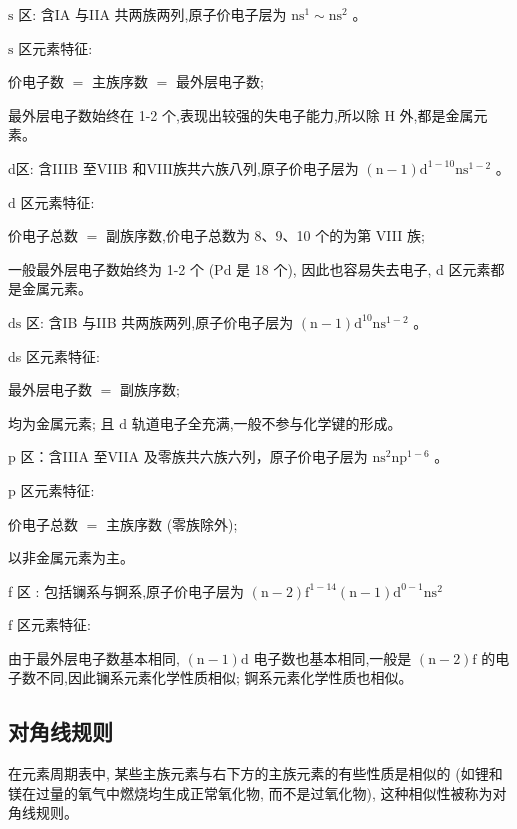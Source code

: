 \documentclass[10pt,cn]{elegantbook}
\begin{document}
\(\mathrm{s}\) 区: 含IA 与IIA 共两族两列,原子价电子层为 \({\mathrm{{ns}}}^{1} \sim {\mathrm{{ns}}}^{2}\) 。

\(\mathrm{s}\) 区元素特征:

 价电子数 \(=\) 主族序数 \(=\) 最外层电子数;

 最外层电子数始终在 1-2 个,表现出较强的失电子能力,所以除 \(\mathrm{H}\) 外,都是金属元素。

d区: 含IIIB 至VIIB 和VIII族共六族八列,原子价电子层为 \(\left( {\mathrm{n} - 1}\right) {\mathrm{d}}^{1 - {10}}{\mathrm{{ns}}}^{1 - 2}\) 。

\(\mathrm{d}\) 区元素特征:

 价电子总数 \(=\) 副族序数,价电子总数为 8、9、10 个的为第 VIII 族;

 一般最外层电子数始终为 1-2 个 (Pd 是 18 个), 因此也容易失去电子, d 区元素都是金属元素。

\(\mathrm{{ds}}\) 区: 含IB 与IIB 共两族两列,原子价电子层为 \(\left( {\mathrm{n} - 1}\right) {\mathrm{d}}^{10}{\mathrm{{ns}}}^{1 - 2}\) 。

ds 区元素特征:

 最外层电子数 \(=\) 副族序数;

 均为金属元素; 且 \(\mathrm{d}\) 轨道电子全充满,一般不参与化学键的形成。

\(\mathrm{p}\) 区：含IIIA 至VIIA 及零族共六族六列，原子价电子层为 \(\mathrm{n{s}^{2}n{p}^{1 - 6}}\) 。

\(\mathrm{p}\) 区元素特征:

价电子总数 \(=\) 主族序数 (零族除外);

以非金属元素为主。

f 区 : 包括镧系与锕系,原子价电子层为 \(\left( {\mathrm{n} - 2}\right) {\mathrm{f}}^{1 - {14}}\left( {\mathrm{n} - 1}\right) {\mathrm{d}}^{0 - 1}{\mathrm{{ns}}}^{2}\)

\(\mathrm{f}\) 区元素特征:

由于最外层电子数基本相同, \(\left( {\mathrm{n} - 1}\right) \mathrm{d}\) 电子数也基本相同,一般是 \(\left( {\mathrm{n} - 2}\right) \mathrm{f}\) 的电子数不同,因此镧系元素化学性质相似; 锕系元素化学性质也相似。

\subsection{对角线规则}

在元素周期表中, 某些主族元素与右下方的主族元素的有些性质是相似的 (如锂和镁在过量的氧气中燃烧均生成正常氧化物, 而不是过氧化物), 这种相似性被称为对角线规则。
\end{document}
